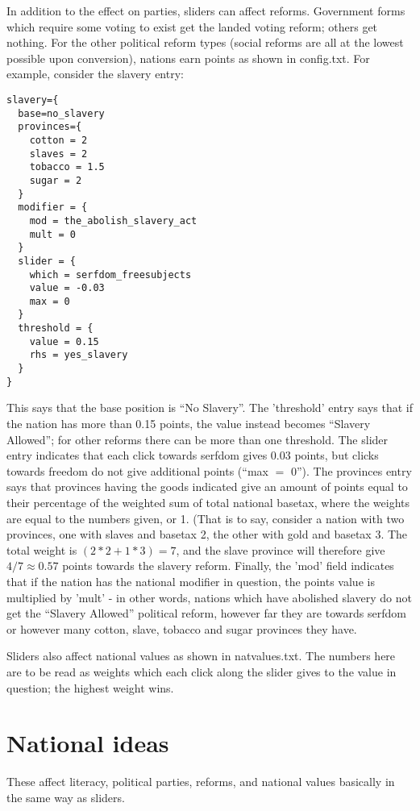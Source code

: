\documentclass[12pt]{article}
\begin{document}
In addition to the effect on parties, sliders can affect reforms. 
Government forms which require some voting to exist get the landed
voting reform; others get nothing. For the other political reform
types (social reforms are all at the lowest possible upon conversion),
nations earn points as shown in config.txt. For example, consider the
slavery entry:
\begin{verbatim}
slavery={
  base=no_slavery
  provinces={
    cotton = 2
    slaves = 2
    tobacco = 1.5
    sugar = 2
  }
  modifier = {
    mod = the_abolish_slavery_act
    mult = 0
  }
  slider = {
    which = serfdom_freesubjects
    value = -0.03
    max = 0 
  }
  threshold = {
    value = 0.15
    rhs = yes_slavery 
  }
}
\end{verbatim}
This says that the base position is ``No Slavery''. The 'threshold'
entry says that if the nation has more than 0.15 points, the value
instead becomes ``Slavery Allowed''; for other reforms there can be
more than one threshold. The slider entry indicates that each click
towards serfdom gives 0.03 points, but clicks towards freedom do not
give additional points (``max $=$ 0''). The provinces entry
says that provinces having the goods indicated give an amount of
points equal to their percentage of the weighted sum of total national
basetax, where the weights are equal to the numbers given, or 1. (That
is to say, consider a nation with two provinces, one with slaves and
basetax 2, the other with gold and basetax 3. The total weight is
$(2*2 + 1*3)=7$, and the slave province will therefore give
$4/7\approx 0.57$ points towards the slavery reform. Finally, the
'mod' field indicates that if the nation has the national modifier in
question, the points value is multiplied by 'mult' - in other words,
nations which have abolished slavery do not get the ``Slavery
Allowed'' political reform, however far they are towards serfdom or
however many cotton, slave, tobacco and sugar provinces they have. 


Sliders also affect national values as shown in natvalues.txt. The
numbers here are to be read as weights which each click along the
slider gives to the value in question; the highest weight wins. 

\section{National ideas}

These affect literacy, political parties, reforms, and national values
basically in the same way as sliders. 
\end{document}
